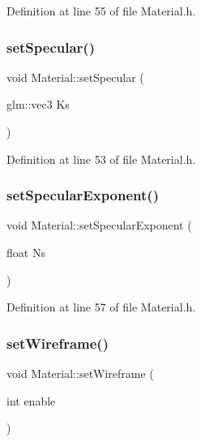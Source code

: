 Definition at line 55 of file Material.\+h.

\mbox{\label{class_material_af55a5fefcf54ddac103e254298381c42}} 
\subsubsection{\texorpdfstring{set\+Specular()}{setSpecular()}}
{\footnotesize\ttfamily void Material\+::set\+Specular (\begin{DoxyParamCaption}\item[{glm\+::vec3}]{Ks }\end{DoxyParamCaption})\hspace{0.3cm}{\ttfamily [inline]}}



Definition at line 53 of file Material.\+h.

\mbox{\label{class_material_a76c5ad9250191eed374fb6d896efd0bb}} 
\subsubsection{\texorpdfstring{set\+Specular\+Exponent()}{setSpecularExponent()}}
{\footnotesize\ttfamily void Material\+::set\+Specular\+Exponent (\begin{DoxyParamCaption}\item[{float}]{Ns }\end{DoxyParamCaption})\hspace{0.3cm}{\ttfamily [inline]}}



Definition at line 57 of file Material.\+h.

\mbox{\label{class_material_ab7326632dff9200c9e4e2c9aa98fed60}} 
\subsubsection{\texorpdfstring{set\+Wireframe()}{setWireframe()}}
{\footnotesize\ttfamily void Material\+::set\+Wireframe (\begin{DoxyParamCaption}\item[{int}]{enable }\end{DoxyParamCaption})\hspace{0.3cm}{\ttfamily [inline]}}



